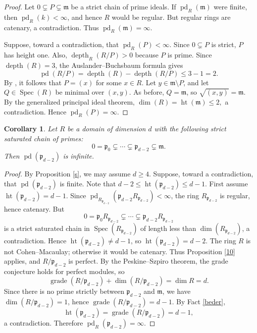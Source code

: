 \documentclass[11.05pt,a4paper]{amsart}
\newtheorem{corollary}[theorem]{Corollary}
\theoremstyle{definition}
\theoremstyle{remark}
\newcommand{\grade}{\operatorname{grade}}
\newcommand{\Spec}{\operatorname{Spec}}
\newcommand{\pd}{\operatorname{pd}}
\newcommand{\depth}{\operatorname{depth}}
\begin{document}
\begin{proof}
	Let $0 \subsetneq P \subsetneq \mathfrak{m}$ be a strict chain of prime ideals. If $\pd_R(\mathfrak{m})$ were finite, then $\pd_R(k)<\infty$, and hence $R$ would be regular. But regular rings are catenary, a contradiction. Thus $\pd_R(\mathfrak{m})=\infty$.
	
	Suppose, toward a contradiction, that $\pd_R(P)<\infty$. Since $0 \subsetneq P$ is strict, $P$ has height one. Also, $\depth_R(R/P)>0$ because $P$ is prime. Since $\depth(R)=3$, the Auslander–Buchsbaum formula gives
	\[
	\pd(R/P)=\depth(R)-\depth(R/P)\leq 3-1=2.
	\]
	By \cite[Corollary 2]{ABU}, it follows that $P=(x)$ for some $x \in R$. Let $y \in \mathfrak{m} \setminus P$, and let $Q \in \Spec(R)$ be minimal over $(x,y)$. As before, $Q=\mathfrak{m}$, so $\sqrt{(x,y)}=\mathfrak{m}$. By the generalized principal ideal theorem,
	\( \dim(R)=\operatorname{ht}(\mathfrak{m})\leq 2,
	\)
	a contradiction. Hence $\pd_R(P)=\infty$.
\end{proof}

\begin{corollary}
	Let $R$ be a domain of dimension $d$ with the following strict saturated chain of primes:
	\[
	0=\mathfrak{p}_0 \subsetneq \cdots \subsetneq \mathfrak{p}_{d-2}\subsetneq \mathfrak{m}.
	\]
	Then $\pd(\mathfrak{p}_{d-2})$ is infinite.
\end{corollary}

\begin{proof}
	By Proposition \ref{s}, we may assume $d\geq 4$. Suppose, toward a contradiction, that $\pd(\mathfrak{p}_{d-2})$ is finite. Note that
	\(
	d-2\leq \operatorname{ht}(\mathfrak{p}_{d-2})\leq d-1.
	\) First assume $\operatorname{ht}(\mathfrak{p}_{d-2})=d-1$. Since $\pd_{R_{\mathfrak{p}_{d-2}}}(\mathfrak{p}_{d-2}R_{\mathfrak{p}_{d-2}})<\infty$, the ring $R_{\mathfrak{p}_{d-2}}$ is regular, hence catenary. But
	\[
	0=\mathfrak{p}_0R_{\mathfrak{p}_{d-2}} \subsetneq \cdots \subsetneq \mathfrak{p}_{d-2}R_{\mathfrak{p}_{d-2}}
	\]
	is a strict saturated chain in $\Spec(R_{\mathfrak{p}_{d-2}})$ of length less than $\dim(R_{\mathfrak{p}_{d-2}})$, a contradiction. Hence $\operatorname{ht}(\mathfrak{p}_{d-2})\neq d-1$, so $\operatorname{ht}(\mathfrak{p}_{d-2})= d-2$.
	The ring $R$ is not Cohen–Macaulay; otherwise it would be catenary. Thus Proposition \ref{10} applies, and $R/\mathfrak{p}_{d-2}$ is perfect. By the Peskine–Szpiro theorem, the grade conjecture holds for perfect modules, so
	\[
	\grade(R/\mathfrak{p}_{d-2})+\dim(R/\mathfrak{p}_{d-2})=\dim R=d.
	\]
	Since there is no prime strictly between $\mathfrak{p}_{d-2}$ and $\mathfrak{m}$, we have $\dim(R/\mathfrak{p}_{d-2})=1$, hence $\grade(R/\mathfrak{p}_{d-2})=d-1$. By Fact \ref{beder},
	\[
	\operatorname{ht}(\mathfrak{p}_{d-2})=\grade(R/\mathfrak{p}_{d-2})=d-1,
	\]
	a contradiction. Therefore $\pd_R(\mathfrak{p}_{d-2})=\infty$.
\end{proof}
\end{document}
